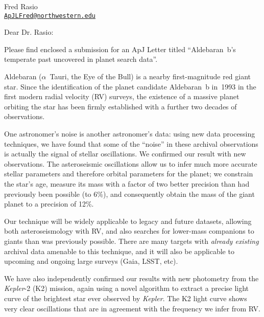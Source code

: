 \documentclass{letter}
\begin{document}
\signature{Will Farr}

\address{Will M. Farr\\School of Physics and Astronomy\\University of Birmingham\\Birmingham\\B15 2TT\\United Kingdom\\\href{mailto:w.farr@bham.ac.uk}{\texttt{w.farr@bham.ac.uk}}}

\begin{letter}
{Fred Rasio \\
\href{mailto:ApJLFred@northwestern.edu}{\texttt{ApJLFred@northwestern.edu}}}

\opening{Dear Dr. Rasio:}

Please find enclosed a submission for an ApJ Letter titled ``Aldebaran~b's
temperate past uncovered in planet search data''.

Aldebaran ($\alpha$~Tauri, the Eye of the Bull) is a nearby first-magnitude red
giant star. Since the identification of the planet candidate Aldebaran~b in~1993
in the first modern radial velocity (RV) surveys, the existence of a massive
planet orbiting the star has been firmly established with a further two decades
of observations.

One astronomer's noise is another astronomer's data: using new data processing
techniques, we have found that some of the ``noise'' in these archival
observations is actually the signal of stellar oscillations. We confirmed our
result with new observations. The asteroseismic oscillations allow us to infer
much more accurate stellar parameters and therefore orbital parameters for the
planet; we constrain the star's age, measure its mass with a factor of two
better precision than had previously been possible (to 6\%), and consequently
obtain the mass of the giant planet to a precision of 12\%.

Our technique will be widely applicable to legacy and future datasets, allowing
both asteroseismology with RV, and also searches for lower-mass companions to
giants than was previously possible.  There are many targets with \emph{already
existing} archival data amenable to this technique, and it will also be
applicable to upcoming and ongoing large surveys (Gaia, LSST, etc).

We have also independently confirmed our results with new photometry from the
\emph{Kepler}-2 (K2) mission, again using a novel algorithm to extract a precise
light curve of the brightest star ever observed by \emph{Kepler}. The K2 light
curve shows very clear oscillations that are in agreement with the frequency we
infer from RV.


\end{letter}
\end{document}
